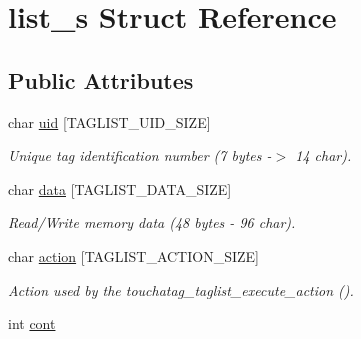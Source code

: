 \hypertarget{structlist__s}{
\section{list\_\-s Struct Reference}
\label{structlist__s}
}
\subsection*{Public Attributes}
\begin{DoxyCompactItemize}
\item 
\hypertarget{structlist__s_a807f3e48c17535b12073867cceb9b80a}{
char \hyperlink{structlist__s_a807f3e48c17535b12073867cceb9b80a}{uid} \mbox{[}TAGLIST\_\-UID\_\-SIZE\mbox{]}}
\label{structlist__s_a807f3e48c17535b12073867cceb9b80a}

\begin{DoxyCompactList}\small\item\em Unique tag identification number (7 bytes -\/$>$ 14 char). \item\end{DoxyCompactList}\item 
\hypertarget{structlist__s_a5c5baf74fa5a846e81f06a867ef149f5}{
char \hyperlink{structlist__s_a5c5baf74fa5a846e81f06a867ef149f5}{data} \mbox{[}TAGLIST\_\-DATA\_\-SIZE\mbox{]}}
\label{structlist__s_a5c5baf74fa5a846e81f06a867ef149f5}

\begin{DoxyCompactList}\small\item\em Read/Write memory data (48 bytes -\/ 96 char). \item\end{DoxyCompactList}\item 
\hypertarget{structlist__s_aafd944c2a78be70bd1088f0ecd1237e5}{
char \hyperlink{structlist__s_aafd944c2a78be70bd1088f0ecd1237e5}{action} \mbox{[}TAGLIST\_\-ACTION\_\-SIZE\mbox{]}}
\label{structlist__s_aafd944c2a78be70bd1088f0ecd1237e5}

\begin{DoxyCompactList}\small\item\em Action used by the touchatag\_\-taglist\_\-execute\_\-action (). \item\end{DoxyCompactList}\item 
\hypertarget{structlist__s_a4acc518c276946f6da3a2134cb1dd810}{
int \hyperlink{structlist__s_a4acc518c276946f6da3a2134cb1dd810}{cont}}
\label{structlist__s_a4acc518c276946f6da3a2134cb1dd810}


\end{DoxyCompactItemize}
